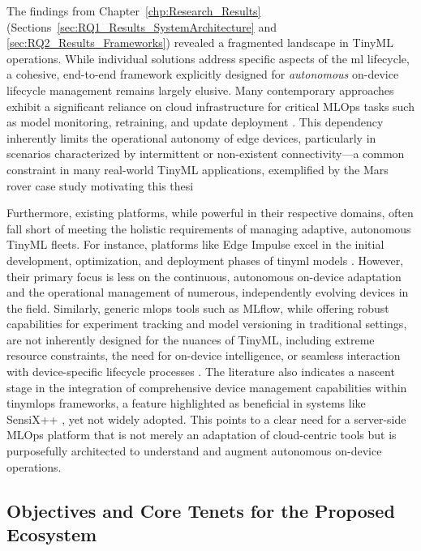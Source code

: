 The findings from Chapter~\ref{chp:Research_Results} (Sections~\ref{sec:RQ1_Results_SystemArchitecture} and \ref{sec:RQ2_Results_Frameworks}) revealed a fragmented landscape in TinyML operations. While individual solutions address specific aspects of the \gls{ml} lifecycle, a cohesive, end-to-end framework explicitly designed for \textit{autonomous} on-device lifecycle management remains largely elusive. Many contemporary approaches exhibit a significant reliance on cloud infrastructure for critical MLOps tasks such as model monitoring, retraining, and update deployment \cite{kreuzbergerMachineLearningOperations2023, antoniniTinyMLOpsFrameworkOrchestrating2022}. This dependency inherently limits the operational autonomy of edge devices, particularly in scenarios characterized by intermittent or non-existent connectivity—a common constraint in many real-world TinyML applications, exemplified by the Mars rover case study motivating this thesi

Furthermore, existing platforms, while powerful in their respective domains, often fall short of meeting the holistic requirements of managing adaptive, autonomous TinyML fleets. For instance, platforms like Edge Impulse excel in the initial development, optimization, and deployment phases of \gls{tinyml} models \cite{banburyEdgeImpulseMLOps2023}. However, their primary focus is less on the continuous, autonomous on-device adaptation and the operational management of numerous, independently evolving devices in the field. Similarly, generic \gls{mlops} tools such as MLflow, while offering robust capabilities for experiment tracking and model versioning in traditional settings, are not inherently designed for the nuances of TinyML, including extreme resource constraints, the need for on-device intelligence, or seamless interaction with device-specific lifecycle processes \cite{johnMLOpsFrameworkMaturity2021}. The literature also indicates a nascent stage in the integration of comprehensive device management capabilities within \gls{tinymlops} frameworks, a feature highlighted as beneficial in systems like SensiX++ \cite{minSensiXBringingMLOps2023}, yet not widely adopted. This points to a clear need for a server-side MLOps platform that is not merely an adaptation of cloud-centric tools but is purposefully architected to understand and augment autonomous on-device operations.

\subsection{Objectives and Core Tenets for the Proposed Ecosystem}
\label{ssec:framework_derived_objectives}

